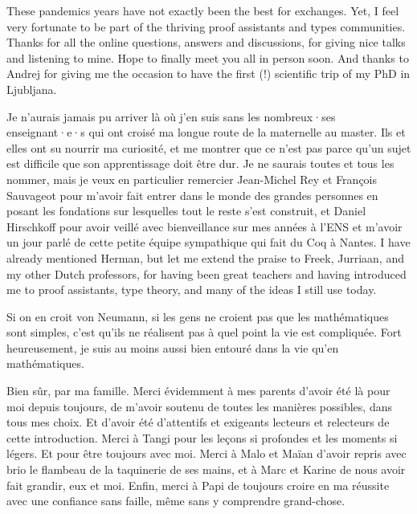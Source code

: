 
These pandemics years have not exactly been the best for exchanges. Yet, I feel very
fortunate to be part of the thriving proof assistants and types communities. Thanks for
all the online questions, answers and discussions, for giving nice talks and listening to
mine. Hope to finally meet you all in person soon. And thanks to Andrej for giving me the
occasion to have the first (!) scientific trip of my PhD in Ljubljana.


Je n’aurais jamais pu arriver là où j’en suis sans les nombreux·ses enseignant·e·s
qui ont croisé ma longue route de la maternelle au master. Ils et elles ont su nourrir
ma curiosité, et me montrer que ce n’est pas parce qu’un sujet est difficile que son
apprentissage doit être dur. Je ne saurais toutes et tous les nommer, mais je veux en
particulier remercier Jean-Michel Rey et François Sauvageot pour m’avoir fait entrer dans
le monde des grandes personnes en posant les fondations sur lesquelles tout le reste s’est
construit, et Daniel Hirschkoff pour avoir veillé avec bienveillance sur mes années à l’ENS
et m’avoir un jour parlé de cette petite équipe sympathique qui fait du Coq à Nantes.
I have already mentioned Herman, but let me extend the praise to Freek, Jurriaan, and
my other Dutch professors, for having been great teachers and having introduced me to proof
assistants, type theory, and many of the ideas I still use today.


Si on en croit von Neumann, si les gens ne croient pas que les mathématiques sont simples,
c’est qu’ils ne réalisent pas à quel point la vie est compliquée. Fort heureusement,
je suis au moins aussi bien entouré dans la vie qu’en mathématiques.

Bien sûr, par ma famille. Merci évidemment à mes parents
d’avoir été là pour moi depuis toujours, de m’avoir soutenu de toutes les manières possibles,
dans tous mes choix. Et d’avoir été
d’attentifs et exigeants lecteurs et relecteurs de cette introduction. Merci à Tangi pour
les leçons si profondes et les moments si légers. Et pour être toujours avec moi.
Merci à Malo et Maïan d’avoir repris avec brio le flambeau de la taquinerie de ses mains,
et à Marc et Karine de nous avoir fait grandir, eux et moi. Enfin, merci à Papi de toujours
croire en ma réussite avec une confiance sans faille, même sans y comprendre grand-chose.

